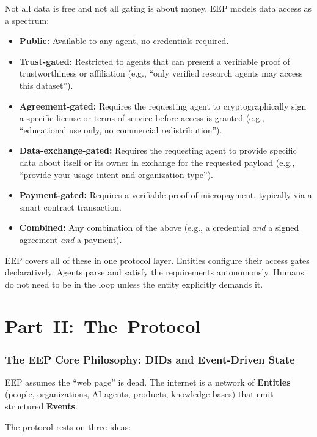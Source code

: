 \documentclass[12pt,a4paper]{article}
\begin{document}
Not all data is free and not all gating is about money. EEP models data access as a spectrum:

\begin{itemize}
    \item \textbf{Public:} Available to any agent, no credentials required.
    \item \textbf{Trust-gated:} Restricted to agents that can present a verifiable proof of trustworthiness or affiliation (e.g., ``only verified research agents may access this dataset'').
    \item \textbf{Agreement-gated:} Requires the requesting agent to cryptographically sign a specific license or terms of service before access is granted (e.g., ``educational use only, no commercial redistribution'').
    \item \textbf{Data-exchange-gated:} Requires the requesting agent to provide specific data about itself or its owner in exchange for the requested payload (e.g., ``provide your usage intent and organization type'').
    \item \textbf{Payment-gated:} Requires a verifiable proof of micropayment, typically via a smart contract transaction.
    \item \textbf{Combined:} Any combination of the above (e.g., a credential \textit{and} a signed agreement \textit{and} a payment).
\end{itemize}

EEP covers all of these in one protocol layer. Entities configure their access gates declaratively. Agents parse and satisfy the requirements autonomously. Humans do not need to be in the loop unless the entity explicitly demands it.

\part*{Part~II:~The~Protocol}
\section{The EEP Core Philosophy: DIDs and Event-Driven State}
\label{sec:philosophy}

EEP assumes the ``web page'' is dead. The internet is a network of \textbf{Entities} (people, organizations, AI agents, products, knowledge bases) that emit structured \textbf{Events}.

The protocol rests on three ideas:
\end{document}
